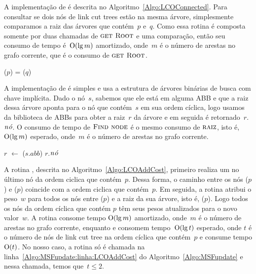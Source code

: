 A implementação de \LCOConnected{} é descrita no Algoritmo~\ref{Algo:LCOConnected}. Para consultar se dois nós de link cut trees estão na mesma árvore, simplesmente comparamos a raiz das árvores que contém~$p$ e~$q$.
Como essa rotina é composta somente por duas chamadas de $\text{\scshape \text{\scshape get Root}}$ e uma comparação, então seu consumo de tempo é~$\mathrm{O}(\lg m)$ amortizado, onde~$m$ é o número de arestas no grafo corrente, que é o consumo de $\text{\scshape \text{\scshape get Root}}$.

\begin{algorithm}[htb]
\caption{\LCOConnected($p$, $q$)}
\label{Algo:LCOConnected}
\begin{algorithmic}[1]
\State \Return \linkcutRoot($p$) = \linkcutRoot($q$)
\end{algorithmic}
\end{algorithm}

A implementação de \LCOFindNode{} é simples e usa a estrutura de árvores binárias de busca com chave implícita.
Dado o nó~$s$, sabemos que ele está em alguma ABB e que a raiz dessa árvore aponta para o nó que contém~$s$ em sua ordem cíclica,
logo usamos \treapGetRoot{} da biblioteca de ABBs para obter a raiz~$r$ da árvore e em seguida é retornado~$r$.$\mathit{n\acute{o}}$.
O consumo de tempo de $\text{\scshape Find node}$ é o mesmo consumo de $\text{\scshape raiz}$, isto é, $\mathrm{O}(\lg m)$ esperado, onde~$m$ é o número de arestas no grafo corrente.

\begin{algorithm}[htb]
\caption{\LCOFindNode($s$)}
\label{Algo:LCOFindNode}
\begin{algorithmic}[1]
\State $r$ $\gets$ \treapGetRoot($s.abb$)
\State \Return $r$.$\mathit{n\acute{o}}$
\end{algorithmic}
\end{algorithm}

A rotina \LCOAddCost{}, descrita no Algoritmo~\ref{Algo:LCOAddCost}, primeiro realiza um \linkcutEvert{} no último nó da ordem ciclica que contém~$p$.
Dessa forma, o caminho entre os nós \treapFirst($p$) e \treapLast($p$) coincide com a ordem ciclica que contém~$p$.
Em seguida, a rotina \linkcutWeight{} atribui o peso~$w$ para todos os nós entre \treapFirst($p$) e a raiz da sua árvore, isto é, \treapLast($p$).
Logo todos os nós da ordem cíclica que contém $p$ têm seus pesos atualizados para o novo valor~$w$.
A rotina \linkcutEvert{} consome tempo $\mathrm{O}(\lg m)$ amortizado, onde~$m$ é o número de arestas no grafo corrente, enquanto \treapLast{} e \treapFirst{} consomem tempo~$\mathrm{O}(\lg t)$ esperado, onde $t$ é o número de nós de link cut tree na ordem cíclica que contém~$p$ e \linkcutWeight{} consume tempo $\mathrm{O}(t)$.
No nosso caso, a rotina \LCOAddCost{} só é chamada na linha~\ref{Algo:MSFupdate:linha:LCOAddCost} do Algoritmo~\ref{Algo:MSFupdate} e nessa chamada, temos que~$t\leq 2$.

